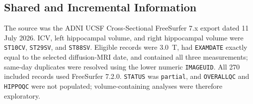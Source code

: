 \documentclass{article}
\providecommand{\DIFchgtex}[1]{{\setlength{\fboxsep}{0pt}\colorbox{yellow}{\strut #1}}}
\providecommand{\DIFchg}[1]{\texorpdfstring{\DIFchgtex{#1}\allowbreak}{#1}}
\providecommand{\DIFchgbegin}{}
\begin{document}
\subsection{Shared and Incremental Information}
\begingroup
\color{blue}
\def\DIFchg#1{#1}
 \DIFchgbegin \DIFchg{The} \DIFchg{source} \DIFchg{was} \DIFchg{the} \DIFchg{ADNI} \DIFchg{UCSF} \DIFchg{Cross-Sectional} \DIFchg{FreeSurfer} \DIFchg{7.x} \DIFchg{export} \DIFchg{dated} \DIFchg{11} \DIFchg{July} \DIFchg{2026.} \DIFchg{ICV,} \DIFchg{left} \DIFchg{hippocampal} \DIFchg{volume,} \DIFchg{and} \DIFchg{right} \DIFchg{hippocampal} \DIFchg{volume} \DIFchg{were} \DIFchg{\texttt{ST10CV},} \DIFchg{\texttt{ST29SV},} \DIFchg{and} \DIFchg{\texttt{ST88SV}.} \DIFchg{Eligible} \DIFchg{records} \DIFchg{were} \DIFchg{3.0~T,} \DIFchg{had} \DIFchg{\texttt{EXAMDATE}} \DIFchg{exactly} \DIFchg{equal} \DIFchg{to} \DIFchg{the} \DIFchg{selected} \DIFchg{diffusion-MRI} \DIFchg{date,} \DIFchg{and} \DIFchg{contained} \DIFchg{all} \DIFchg{three} \DIFchg{measurements;} \DIFchg{same-day} \DIFchg{duplicates} \DIFchg{were} \DIFchg{resolved} \DIFchg{using} \DIFchg{the} \DIFchg{lower} \DIFchg{numeric} \DIFchg{\texttt{IMAGEUID}.} \DIFchg{All} \DIFchg{270} \DIFchg{included} \DIFchg{records} \DIFchg{used} \DIFchg{FreeSurfer} \DIFchg{7.2.0.} \DIFchg{\texttt{STATUS}} \DIFchg{was} \DIFchg{\texttt{partial},} \DIFchg{and} \DIFchg{\texttt{OVERALLQC}} \DIFchg{and} \DIFchg{\texttt{HIPPOQC}} \DIFchg{were} \DIFchg{not} \DIFchg{populated;} \DIFchg{volume-containing} \DIFchg{analyses} \DIFchg{were} \DIFchg{therefore} \DIFchg{exploratory.}
\endgroup
\end{document}
